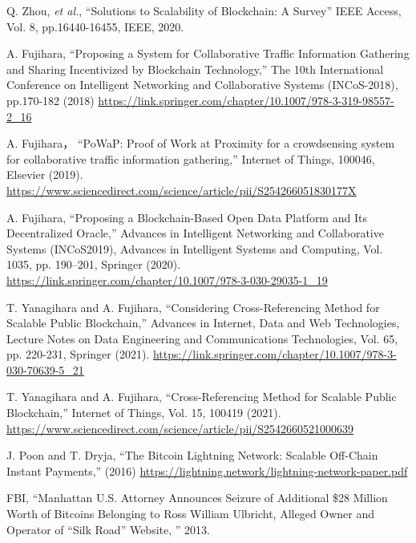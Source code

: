 \documentclass[graybox]{svmult}
\begin{document}
\begin{thebibliography}{99}
  Q. Zhou, \textit{et al.}, 
  ``Solutions to Scalability of Blockchain: A Survey''
  IEEE Access, Vol. 8, pp.16440-16455, IEEE, 2020. 


  A. Fujihara,
  ``Proposing a System for Collaborative Traffic Information Gathering and 
  Sharing Incentivized by Blockchain Technology,''
  The 10th International Conference on Intelligent Networking and 
  Collaborative Systems (INCoS-2018), pp.170-182 (2018)
  \url{https://link.springer.com/chapter/10.1007/978-3-319-98557-2_16}

  A. Fujihara，
  ``PoWaP: Proof of Work at Proximity for a crowdsensing system for 
  collaborative traffic information gathering,'' 
  Internet of Things, 100046, Elsevier (2019).
  \url{https://www.sciencedirect.com/science/article/pii/S254266051830177X}

  A. Fujihara, 
  ``Proposing a Blockchain-Based Open Data Platform and Its Decentralized Oracle,''
  Advances in Intelligent Networking and Collaborative Systems (INCoS2019), 
  Advances in Intelligent Systems and Computing, 
  Vol. 1035, pp. 190--201, Springer (2020).
  \url{https://link.springer.com/chapter/10.1007/978-3-030-29035-1_19}

  T. Yanagihara and A. Fujihara, 
  ``Considering Cross-Referencing Method for Scalable Public Blockchain,''
  Advances in Internet, Data and Web Technologies, 
  Lecture Notes on Data Engineering and Communications Technologies, 
  Vol. 65, pp. 220-231, Springer (2021). 
  \url{https://link.springer.com/chapter/10.1007/978-3-030-70639-5_21}

  T. Yanagihara and A. Fujihara,
  ``Cross-Referencing Method for Scalable Public Blockchain,''
  Internet of Things, Vol. 15, 100419 (2021). 
  \url{https://www.sciencedirect.com/science/article/pii/S2542660521000639}


  J. Poon and T. Dryja, 
  ``The Bitcoin Lightning Network: Scalable Off-Chain Instant Payments,'' 
  (2016) \url{https://lightning.network/lightning-network-paper.pdf}


  FBI, 
  ``Manhattan U.S. Attorney Announces Seizure of Additional \$28 Million 
    Worth of Bitcoins Belonging to Ross William Ulbricht, Alleged Owner 
    and Operator of ``Silk Road'' Website, '' 2013.


\end{thebibliography}
\end{document}
